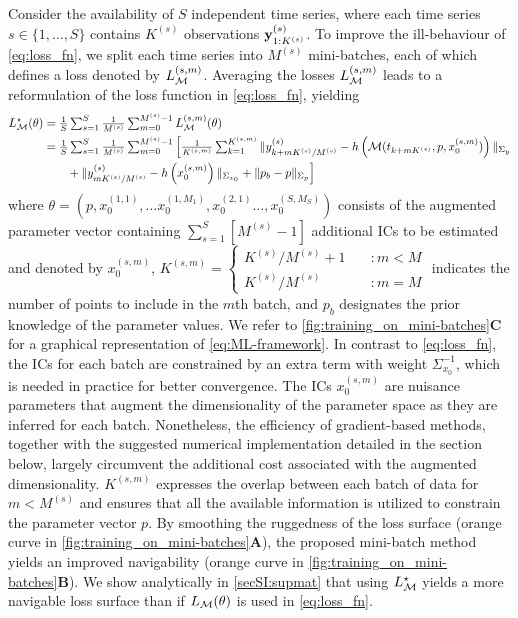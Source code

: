 Consider the availability of $S$ independent time series, where each time series $s \in \{1,\dots,S\}$ contains $K^{(s)}$ observations $\textbf{y}_{1:K^{(s)}}^{(s)}$. To improve the ill-behaviour of \cref{eq:loss_fn}, we split each time series into $M^{(s)}$ mini-batches, each of which defines a loss denoted by $L_{\mathcal{M}}^{(s,m)}$.
%
Averaging the losses $L_{\mathcal{M}}^{(s,m)}$ leads to a reformulation of the loss function in \cref{eq:loss_fn}, yielding
%
\begin{equation}\label{eq:ML-framework}
    \begin{split}
        L_{\mathcal{M}}^\star(\theta) &=  \textstyle \frac{1}{S}\sum_{s=1}^{S} \frac{1}{M^{(s)}} \textstyle \sum_{m=0}^{M^{(s)}-1} L_{\mathcal{M}}^{(s,m)}(\theta)\\
        &= \textstyle \frac{1}{S} \textstyle \sum_{s=1}^{S} \frac{1}{M^{(s)}} \textstyle \sum_{m=0}^{M^{(s)}-1} \Big[ \textstyle \frac{1}{K^{(s,m)}}  \sum_{k=1}^{K^{(s,m)}} \|y_{k + m K^{(s)} / M^{(s)}}^{(s)} - h\left(\mathcal{M}(t_{k + m K^{(s)}}, p, x_{0}^{(s,m)})\right)\|_{\Sigma_y} \\
        & \qquad 
        + \|y_{m K^{(s)} / M^{(s)}}^{(s)} - h\left(x_{0}^{(s,m)}\right)\|_{\Sigma_{x_0}} 
        + \|p_b -  p\|_{\Sigma_p} \Big]
    \end{split}
\end{equation}
%
where 
% 
$\theta = (p, x_{0}^{(1,1)}, \dots  x_0^{(1,M_1)}, x_{0}^{(2,1)} \dots, x_{0}^{(S,M_S)})$ 
%
consists of the augmented parameter vector containing 
%
$\sum_{s=1}^S \left[ M^{(s)} -1 \right]$ 
%
additional ICs to be estimated and denoted by  $x_{0}^{(s,m)}$, 
% 
$K^{(s,m)} = \begin{cases} K^{(s)} / M^{(s)} + 1 &\quad \colon m < M \\ 
                    K^{(s)} / M^{(s)} &\quad \colon m = M
        \end{cases}$ 
% 
% 
indicates the number of points to include in the $m$th batch, and 
% 
$p_b$ 
% 
designates the prior knowledge of the parameter values. 
% 
We refer to \cref{fig:training_on_mini-batches}\textbf{C} for a graphical representation of \cref{eq:ML-framework}.
%
In contrast to \cref{eq:loss_fn}, the ICs for each batch are constrained by an extra term with weight $\Sigma_{x_0}^{-1}$, which is needed in practice for better convergence.
% 
The ICs $x_{0}^{(s,m)}$ are nuisance parameters that augment the dimensionality of the parameter space as they are inferred for each batch. Nonetheless, the efficiency of gradient-based methods, together with the suggested numerical implementation detailed in the section below, largely circumvent the additional cost associated with the augmented dimensionality.
% 
$K^{(s,m)}$ expresses the overlap between each batch of data for $m < M^{(s)}$ and ensures that all the available information is utilized to constrain the parameter vector $p$.
%
By smoothing the ruggedness of the loss surface (orange curve in \cref{fig:training_on_mini-batches}\textbf{A}), the proposed mini-batch method yields an improved navigability (orange curve in \cref{fig:training_on_mini-batches}\textbf{B}). We show analytically in \cref{secSI:supmat} that using $L_{\mathcal{M}}^\star$ yields a more navigable loss surface than if $L_{\mathcal{M}}(\theta)$ is used in \cref{eq:loss_fn}.

